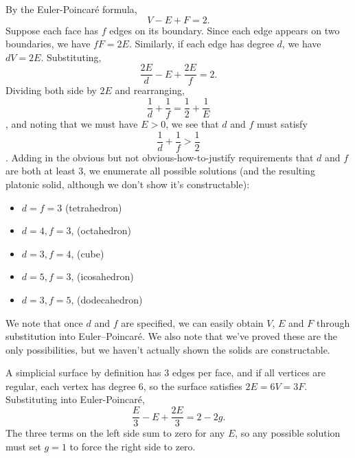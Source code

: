 \documentclass[11pt]{article}
\newenvironment{exercise}[2][Exercise]{\begin{trivlist}
\item[\hskip \labelsep {\bfseries #1}\hskip \labelsep {\bfseries #2}]}{\end{trivlist}}
\begin{document}
\begin{exercise}{2.2, Platonic Solids.}
  By the Euler-Poincar\'{e} formula,
  $$V - E + F = 2.$$
  Suppose each face has $f$ edges on its boundary. Since each edge appears on two boundaries, we have $fF = 2E$. Similarly, if each edge has degree $d$, we have $dV = 2E$. Substituting,
  $$\frac{2E}{d} - E + \frac{2E}{f} = 2.$$
  Dividing both side by $2E$ and rearranging,
  $$\frac{1}{d} + \frac{1}{f} = \frac{1}{2} + \frac{1}{E}$$,
  and noting that we must have $E > 0$, we see that $d$ and $f$ must satisfy
  $$\frac{1}{d} + \frac{1}{f} > \frac{1}{2}$$.
  Adding in the obvious but not obvious-how-to-justify requirements that $d$ and $f$ are both at least 3, we enumerate all possible solutions (and the resulting platonic solid, although we don't show it's constructable):
  \begin{itemize}
  \item{$d = f = 3$ (tetrahedron)}
  \item{$d = 4, f = 3$, (octahedron)}
  \item{$d = 3, f = 4$, (cube)}
  \item{$d = 5, f = 3$, (icosahedron)}
  \item{$d = 3, f = 5$, (dodecahedron)}
  \end{itemize}
  We note that once $d$ and $f$ are specified, we can easily obtain $V$, $E$ and $F$ through substitution into Euler--Poincar\'{e}. We also note that we've proved these are the only possibilities, but we haven't actually shown the solids are constructable.
\end{exercise}

\begin{exercise}{2.3, Regular Valence.}
  A simplicial surface by definition has 3 edges per face, and if all vertices are regular, each vertex has degree 6, so the surface satisfies $2E = 6V = 3F$. Substituting into Euler-Poincar\'{e},
  $$\frac{E}{3} - E + \frac{2E}{3} = 2 - 2g.$$
  The three terms on the left side sum to zero for any $E$, so any possible solution must set $g = 1$ to force the right side to zero.
\end{exercise}
\end{document}
